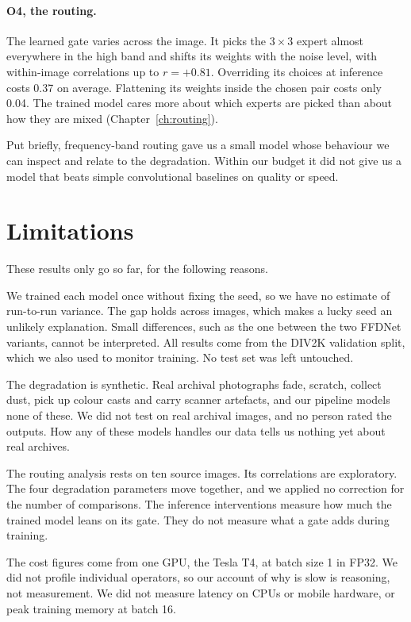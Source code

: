 \paragraph{O4, the routing.} The learned gate varies across the image. It
picks the $3\times3$ expert almost everywhere in the high band and shifts its
weights with the noise level, with within-image correlations up to
$r=+0.81$. Overriding its choices at inference costs 0.37\dB{} on average.
Flattening its weights inside the chosen pair costs only 0.04\dB{}. The
trained model cares more about which experts are picked than about how they
are mixed (Chapter~\ref{ch:routing}).

Put briefly, frequency-band routing gave us a small model whose behaviour we
can inspect and relate to the degradation. Within our budget it did not give
us a model that beats simple convolutional baselines on quality or speed.

\section{Limitations}\label{sec:limitations}

These results only go so far, for the following reasons.

We trained each model once without fixing the seed, so we have no estimate
of run-to-run variance. The gap holds across images, which makes a lucky
seed an unlikely explanation. Small differences, such as the one between the
two FFDNet variants, cannot be interpreted. All results come from the DIV2K
validation split, which we also used to monitor training. No test set was
left untouched.

The degradation is synthetic. Real archival photographs fade, scratch,
collect dust, pick up colour casts and carry scanner artefacts, and our
pipeline models none of these. We did not test on real archival images, and
no person rated the outputs. How any of these models handles our data tells
us nothing yet about real archives.

The routing analysis rests on ten source images. Its correlations are
exploratory. The four degradation parameters move together, and we applied
no correction for the number of comparisons. The inference interventions
measure how much the trained model leans on its gate. They do not measure
what a gate adds during training.

The cost figures come from one GPU, the Tesla T4, at batch size 1 in FP32.
We did not profile individual operators, so our account of why \fcsg{} is
slow is reasoning, not measurement. We did not measure latency on CPUs or
mobile hardware, or peak training memory at batch 16.

